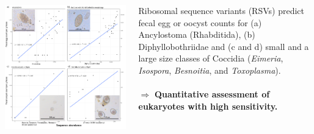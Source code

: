 \documentclass[30pt, a0paper, portrait, margin=0mm, innermargin=15mm,
               blockverticalspace=15mm, colspace=15mm, subcolspace=8mm]{tikzposter}
\begin{document}
\begin{columns}
      {
        \begin{minipage}{0.7\linewidth}                  
          \begin{left}
            \includegraphics[scale=0.7]{Figure2_man.png}
          \end{left}
        \end{minipage}
        \hfill
        \begin{minipage}{0.3\linewidth}
          Ribosomal sequence variants (RSVs) predict
          fecal egg or oocyst counts for (a) Ancylostoma (Rhabditida),
          (b) Diphyllobothriidae and (c and d) small and a large size
          classes of Coccidia (\textit{Eimeria}, \textit{Isospora},
          \textit{Besnoitia}, and \textit{Toxoplasma}).
          \\ \\ $\Rightarrow$
          \textbf{Quantitative assessment of eukaryotes with high
            sensitivity.}
        \end{minipage}
      }


\end{columns}
\end{document}
